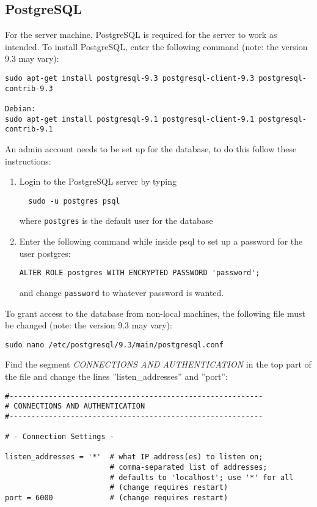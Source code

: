 \subsection{PostgreSQL}
For the server machine, PostgreSQL is required for the server to work as intended. To install PostgreSQL, enter the following command (note: the version 9.3 may vary):
\begin{verbatim}
sudo apt-get install postgresql-9.3 postgresql-client-9.3 postgresql-contrib-9.3 

Debian:
sudo apt-get install postgresql-9.1 postgresql-client-9.1 postgresql-contrib-9.1
\end{verbatim}

An admin account needs to be set up for the database, to do this follow these instructions:

\begin{enumerate}
\item Login to the PostgreSQL server by typing \begin{verbatim}  sudo -u postgres psql \end{verbatim}
where \texttt{postgres} is the default user for the database
\item Enter the following command while inside psql to set up a password for the user postgres:
\begin{verbatim}
ALTER ROLE postgres WITH ENCRYPTED PASSWORD 'password';
\end{verbatim}
and change \texttt{password} to whatever password is wanted.
\end{enumerate}

To grant access to the database from non-local machines, the following file must be changed (note: the version 9.3 may vary):
\begin{verbatim}
sudo nano /etc/postgresql/9.3/main/postgresql.conf
\end{verbatim}
Find the segment \emph{CONNECTIONS AND AUTHENTICATION} in the top part of the file and change the lines ''listen\_addresses'' and ''port'':

\begin{verbatim}
#----------------------------------------------------------
# CONNECTIONS AND AUTHENTICATION
#----------------------------------------------------------

# - Connection Settings -

listen_addresses = '*'  # what IP address(es) to listen on;
                        # comma-separated list of addresses;
                        # defaults to 'localhost'; use '*' for all
                        # (change requires restart)
port = 6000             # (change requires restart)

\end{verbatim}

